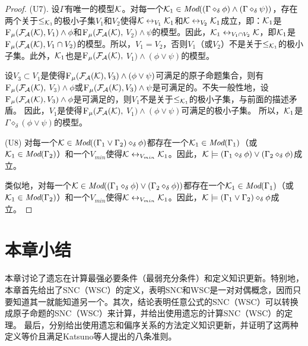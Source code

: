 \begin{proof}
	
	(U7). 设$\Gamma$有唯一的模型${\cal K}$。对每一个${\cal K}_1 \in \textit{Mod}((\Gamma \diamond_{\delta} \phi) \wedge (\Gamma \diamond_{\delta} \psi))$，存在两个关于$\leq_{{\cal K}_1}$的极小子集$V_1$和$V_2$使得${\cal K} \leftrightarrow_{V_1} {\cal K}_1$和${\cal K} \leftrightarrow_{V_2} {\cal K}_1$成立，即：${\cal K}_1$是${\textsc{F}_{\textsc{$\mu$}}}({\cal F}_{{\cal A}}({\cal K}), V_1) \wedge \phi$和${\textsc{F}_{\textsc{$\mu$}}}({\cal F}_{{\cal A}}({\cal K}),$ $V_2) \wedge \psi$的模型。因此，${\cal K}_1 \leftrightarrow_{V_1 \cap V_2} {\cal K}$，即${\cal K}_1$是${\textsc{F}_{\textsc{$\mu$}}}({\cal F}_{{\cal A}}({\cal K}), V_1 \cap V_2)$的模型。所以，$V_1 = V_2$，否则$V_1$（或$V_2$）不是关于$\leq_{{\cal K}_1}$的极小子集。此外，${\cal K}_1$也是${\textsc{F}_{\textsc{$\mu$}}}({\cal F}_{{\cal A}}({\cal K}),$ $ V_1) \wedge (\phi \vee \psi)$的模型。
	
	设$V_3\subset V_1$是使得${\textsc{F}_{\textsc{$\mu$}}}({\cal F}_{{\cal A}}({\cal K}), V_3) \wedge (\phi \vee \psi)$可满足的原子命题集合，则有${\textsc{F}_{\textsc{$\mu$}}}({\cal F}_{{\cal A}}({\cal K}),$ $V_3) \wedge \phi$或${\textsc{F}_{\textsc{$\mu$}}}({\cal F}_{{\cal A}}({\cal K}), V_3) \wedge \psi$是可满足的。不失一般性地，设${\textsc{F}_{\textsc{$\mu$}}}({\cal F}_{{\cal A}}({\cal K}), V_3) \wedge \phi$是可满足的，则$V_1$不是关于$\leq_{{\cal K}_1}$的极小子集，与前面的描述矛盾。
	因此，$V_1$是使得${\textsc{F}_{\textsc{$\mu$}}}({\cal F}_{{\cal A}}({\cal K}),$ $V_1) \wedge (\phi \vee \psi)$可满足的极小子集。
	所以，${\cal K}_1$是$\Gamma \diamond_{\delta} (\phi \vee \psi)$的模型。
	
	(U8) 对每一个${\cal K} \in \textit{Mod}((\Gamma_1 \vee \Gamma_2) \diamond_{\delta} \phi)$都存在一个${\cal K}_1 \in \textit{Mod}(\Gamma_1)$（或${\cal K}_1\in \textit{Mod}(\Gamma_2)$）和一个$V_{min}$使得${\cal K} \leftrightarrow_{V_{min}} {\cal K}_1$。因此，${\cal K} \models  (\Gamma_1 \diamond_{\delta} \phi) \vee (\Gamma_2 \diamond_{\delta} \phi)$成立。
	
	类似地，对每一个${\cal K} \in \textit{Mod}( (\Gamma_1 \diamond_{\delta} \phi) \vee (\Gamma_2 \diamond_{\delta} \phi))$都存在一个${\cal K}_1\in \textit{Mod}(\Gamma_1)$（或${\cal K}_1 \in \textit{Mod}(\Gamma_2)$）和一个$V_{min}$使得${\cal K} \leftrightarrow_{V_{min}} {\cal K}_1$。因此，${\cal K} \models (\Gamma_1 \vee \Gamma_2) \diamond_{\delta} \phi$成立。
\end{proof}

\section{本章小结}\label{sec:chapter07-conclusion}

本章讨论了遗忘在计算最强必要条件（最弱充分条件）和定义知识更新。特别地，本章首先给出了SNC（WSC）的定义，表明SNC和WSC是一对对偶概念，因而只要知道其一就能知道另一个。其次，结论表明任意公式的SNC（WSC）可以转换成原子命题的SNC（WSC）来计算，并给出使用遗忘的计算SNC（WSC）的定理。
最后，分别给出使用遗忘和偏序关系的方法定义知识更新，并证明了这两种定义等价且满足Katsuno等人提出的八条准则。
